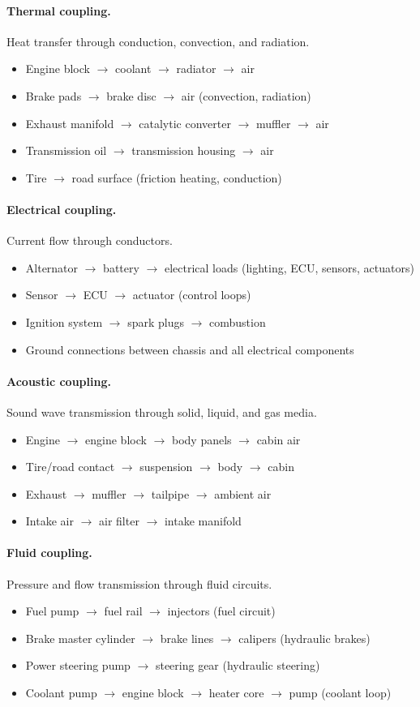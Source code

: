\documentclass[twocolumn,10pt,a4paper]{article}
\theoremstyle{definition}
\theoremstyle{remark}
\begin{document}
\paragraph{Thermal coupling.} Heat transfer through conduction, convection, and radiation.
\begin{itemize}
\item Engine block $\to$ coolant $\to$ radiator $\to$ air
\item Brake pads $\to$ brake disc $\to$ air (convection, radiation)
\item Exhaust manifold $\to$ catalytic converter $\to$ muffler $\to$ air
\item Transmission oil $\to$ transmission housing $\to$ air
\item Tire $\to$ road surface (friction heating, conduction)
\end{itemize}

\paragraph{Electrical coupling.} Current flow through conductors.
\begin{itemize}
\item Alternator $\to$ battery $\to$ electrical loads (lighting, ECU, sensors, actuators)
\item Sensor $\to$ ECU $\to$ actuator (control loops)
\item Ignition system $\to$ spark plugs $\to$ combustion
\item Ground connections between chassis and all electrical components
\end{itemize}

\paragraph{Acoustic coupling.} Sound wave transmission through solid, liquid, and gas media.
\begin{itemize}
\item Engine $\to$ engine block $\to$ body panels $\to$ cabin air
\item Tire/road contact $\to$ suspension $\to$ body $\to$ cabin
\item Exhaust $\to$ muffler $\to$ tailpipe $\to$ ambient air
\item Intake air $\to$ air filter $\to$ intake manifold
\end{itemize}

\paragraph{Fluid coupling.} Pressure and flow transmission through fluid circuits.
\begin{itemize}
\item Fuel pump $\to$ fuel rail $\to$ injectors (fuel circuit)
\item Brake master cylinder $\to$ brake lines $\to$ calipers (hydraulic brakes)
\item Power steering pump $\to$ steering gear (hydraulic steering)
\item Coolant pump $\to$ engine block $\to$ heater core $\to$ pump (coolant loop)
\end{itemize}
\end{document}
